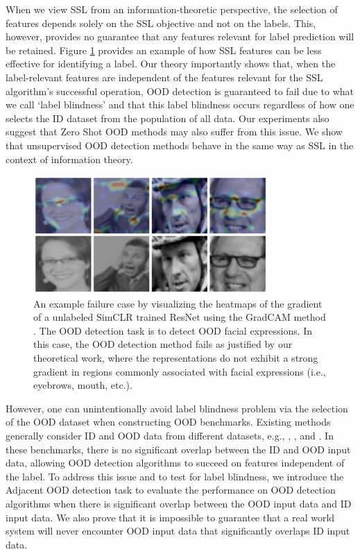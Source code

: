 \documentclass[11pt, oneside]{book}
\theoremstyle{plain}
\theoremstyle{definition}
\theoremstyle{remark}
\begin{document}
When we view SSL from an information-theoretic perspective, the selection of features depends solely on the SSL objective and not on the labels. This, however, provides no guarantee that any features relevant for label prediction will be retained. Figure \ref{fig:grad} provides an example of how SSL features can be less effective for identifying a label. Our theory importantly shows that, when the label-relevant features are independent of the features relevant for the SSL algorithm's successful operation, OOD detection is guaranteed to fail due to what we call `label blindness' and that this label blindness occurs regardless of how one selects the ID dataset from the population of all data. Our experiments also suggest that Zero Shot OOD methods \citep{wang2023clipn, esmaeilpour2022zero} may also suffer from this issue. We show that unsupervised OOD detection methods behave in the same way as SSL in the context of information theory.

\begin{figure}[h]
    \centering
    \includegraphics[width=0.8\textwidth]{images/gradcam_example_faces.png}
    \caption{An example failure case by visualizing the heatmaps of the gradient of a unlabeled SimCLR trained ResNet \citep{chen2020simple} using the GradCAM method \citep{selvaraju2017grad}. The OOD detection task is to detect OOD facial expressions. In this case, the OOD detection method fails as justified by our theoretical work, where the representations do not exhibit a strong gradient in regions commonly associated with facial expressions (i.e., eyebrows, mouth, etc.).}
    \label{fig:grad}
\end{figure}

However, one can unintentionally avoid label blindness problem via the selection of the OOD dataset when constructing OOD benchmarks. Existing methods generally consider ID and OOD data from different datasets, e.g., \citet{fort2021exploring}, \citet{sehwag2021ssd}, and \citet{hendrycks2019using}. In these benchmarks, there is no significant overlap between the ID and OOD input data, allowing OOD detection algorithms to succeed on features independent of the label. To address this issue and to test for label blindness, we introduce the Adjacent OOD detection task to evaluate the performance on OOD detection algorithms when there is significant overlap between the OOD input data and ID input data. We also prove that it is impossible to guarantee that a real world system will never encounter OOD input data that significantly overlaps ID input data.
\end{document}
